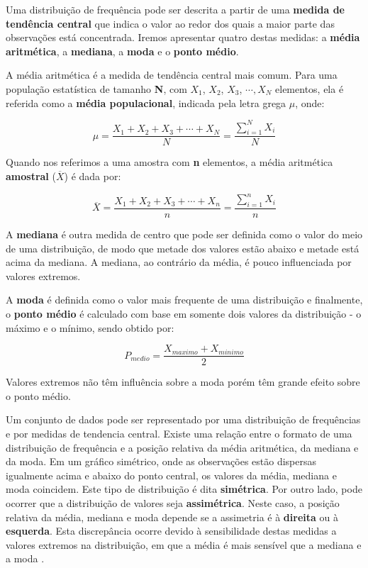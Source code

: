 \documentclass[
]{book}
\begin{document}
Uma distribuição de frequência pode ser descrita a partir de uma \textbf{medida de tendência central} que indica o valor ao redor dos quais a maior parte das observações está concentrada. Iremos apresentar quatro destas medidas: a \textbf{média aritmética}, a \textbf{mediana}, a \textbf{moda} e o \textbf{ponto médio}.

A média aritmética é a medida de tendência central mais comum. Para uma população estatística de tamanho \textbf{N}, com \(X_1\), \(X_2\), \(X_3\), \(\cdots, X_N\) elementos, ela é referida como a \textbf{média populacional}, indicada pela letra grega \(\mu\), onde:

\[\mu=\frac{X_1+X_2+X_3+\cdots+X_N}{N}=\frac{\sum_{i=1}^N{X_i}}{N}\]

Quando nos referimos a uma amostra com \textbf{n} elementos, a média aritmética \textbf{amostral} (\(\overline{X}\)) é dada por:

\[\overline{X}=\frac{X_1+X_2+X_3+\cdots+X_n}{n}=\frac{\sum_{i=1}^n{X_i}}{n}\]

A \textbf{mediana} é outra medida de centro que pode ser definida como o valor do meio de uma distribuição, de modo que metade dos valores estão abaixo e metade está acima da mediana. A mediana, ao contrário da média, é pouco influenciada por valores extremos.

A \textbf{moda} é definida como o valor mais frequente de uma distribuição e finalmente, o \textbf{ponto médio} é calculado com base em somente dois valores da distribuição - o máximo e o mínimo, sendo obtido por:

\[P_{medio}=\frac{X_{maximo} + X_{minimo}}{2}\]

Valores extremos não têm influência sobre a moda porém têm grande efeito sobre o ponto médio.

Um conjunto de dados pode ser representado por uma distribuição de frequências e por medidas de tendencia central. Existe uma relação entre o formato de uma distribuição de frequência e a posição relativa da média aritmética, da mediana e da moda. Em um gráfico simétrico, onde as observações estão dispersas igualmente acima e abaixo do ponto central, os valores da média, mediana e moda coincidem. Este tipo de distribuição é dita \textbf{simétrica}. Por outro lado, pode ocorrer que a distribuição de valores seja \textbf{assimétrica}. Neste caso, a posição relativa da média, mediana e moda depende se a assimetria é à \textbf{direita} ou à \textbf{esquerda}. Esta discrepância ocorre devido à sensibilidade destas medidas a valores extremos na distribuição, em que a média é mais sensível que a mediana e a moda \citep{triola2017introduccao}.
\end{document}

